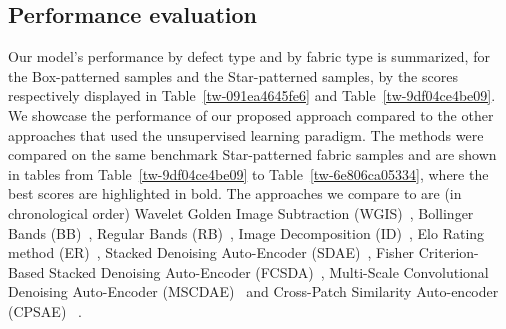 \documentclass[3p,,preprint,review,12pt]{elsarticle}
\begin{document}
\subsection{Performance evaluation}
Our model's performance by defect type and by fabric type is summarized, for the Box-patterned samples and the Star-patterned samples, by the scores respectively displayed in Table~\ref{tw-091ea4645fe6} and Table~\ref{tw-9df04ce4be09}. We showcase the performance of our proposed approach compared to the other approaches that used the unsupervised learning paradigm. The methods were compared on the same benchmark Star-patterned fabric samples and are shown in tables from Table~\ref{tw-9df04ce4be09} to Table~\ref{tw-6e806ca05334}, where the best scores are highlighted in bold. The approaches we compare to are (in chronological order) Wavelet Golden Image Subtraction (WGIS)\unskip~\cite{981091:21201168}, Bollinger Bands (BB)\unskip~\cite{981091:21201212}, Regular Bands (RB)\unskip~\cite{981091:21201213}, Image Decomposition (ID)\unskip~\cite{981091:21201214}, Elo Rating method (ER)\unskip~\cite{981091:21201215}, Stacked Denoising Auto-Encoder (SDAE)\unskip~\cite{981091:21201196}, Fisher Criterion-Based Stacked Denoising Auto-Encoder (FCSDA)\unskip~\cite{981091:21201196}, Multi-Scale Convolutional Denoising Auto-Encoder (MSCDAE)\unskip~\cite{981091:21201198}  and Cross-Patch Similarity Auto-encoder (CPSAE)\unskip~\cite{981091:21201169} .
\end{document}
